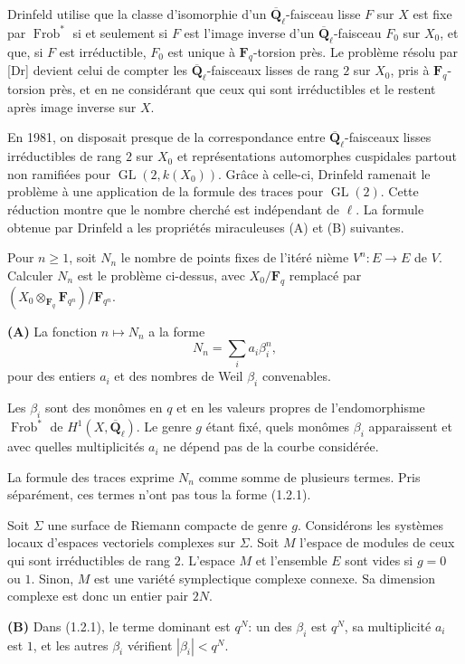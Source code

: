 \documentclass[11pt]{article}
\newcommand{\Fq}{\mathbf{F}_q}
\newcommand{\Fqn}{\mathbf{F}_{q^n}}
\newcommand{\Qbl}{\overline{\mathbf{Q}}_{\ell}}
\newcommand{\Frob}{\operatorname{Frob}}
\newcommand{\GL}{\operatorname{GL}}
\begin{document}
Drinfeld utilise que la classe d'isomorphie d'un \(\Qbl\)-faisceau lisse \(F\) sur \(X\) est fixe par \(\Frob^*\) si et seulement si \(F\) est l'image inverse d'un \(\Qbl\)-faisceau \(F_0\) sur \(X_0\), et que, si \(F\) est irréductible, \(F_0\) est unique à \(\Fq\)-torsion près. Le problème résolu par [Dr] devient celui de compter les \(\Qbl\)-faisceaux lisses de rang \(2\) sur \(X_0\), pris à \(\Fq\)-torsion près, et en ne considérant que ceux qui sont irréductibles et le restent après image inverse sur \(X\).

En 1981, on disposait presque de la correspondance entre \(\Qbl\)-faisceaux lisses irréductibles de rang \(2\) sur \(X_0\) et représentations automorphes cuspidales partout non ramifiées pour \(\GL(2,k(X_0))\). Grâce à celle-ci, Drinfeld ramenait le problème à une application de la formule des traces pour \(\GL(2)\). Cette réduction montre que le nombre cherché est indépendant de \(\ell\). La formule obtenue par Drinfeld a les propriétés miraculeuses (A) et (B) suivantes.

Pour \(n\ge 1\), soit \(N_n\) le nombre de points fixes de l'itéré nième \(V^n:E\to E\) de \(V\). Calculer \(N_n\) est le problème ci-dessus, avec \(X_0/\Fq\) remplacé par \((X_0\otimes_{\Fq}\Fqn)/\Fqn\).

\medskip
\noindent\textbf{(A)} La fonction \(n\mapsto N_n\) a la forme
\begin{equation}
N_n=\sum_i a_i\beta_i^n,
\tag{1.2.1}
\end{equation}
pour des entiers \(a_i\) et des nombres de Weil \(\beta_i\) convenables.

Les \(\beta_i\) sont des monômes en \(q\) et en les valeurs propres de l'endomorphisme \(\Frob^*\) de \(H^1(X,\Qbl)\). Le genre \(g\) étant fixé, quels monômes \(\beta_i\) apparaissent et avec quelles multiplicités \(a_i\) ne dépend pas de la courbe considérée.

La formule des traces exprime \(N_n\) comme somme de plusieurs termes. Pris séparément, ces termes n'ont pas tous la forme (1.2.1).

Soit \(\Sigma\) une surface de Riemann compacte de genre \(g\). Considérons les systèmes locaux d'espaces vectoriels complexes sur \(\Sigma\). Soit \(M\) l'espace de modules de ceux qui sont irréductibles de rang \(2\). L'espace \(M\) et l'ensemble \(E\) sont vides si \(g=0\) ou \(1\). Sinon, \(M\) est une variété symplectique complexe connexe. Sa dimension complexe est donc un entier pair \(2N\).

\medskip
\noindent\textbf{(B)} Dans (1.2.1), le terme dominant est \(q^N\): un des \(\beta_i\) est \(q^N\), sa multiplicité \(a_i\) est \(1\), et les autres \(\beta_i\) vérifient \(|\beta_i|<q^N\).
\end{document}
